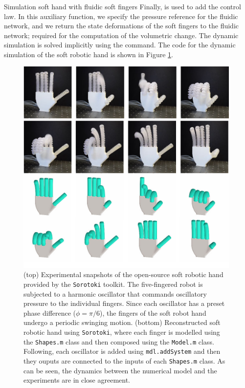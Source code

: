 \begin{example}{Simulation soft hand with fluidic soft fingers}
Finally,  is used to add the control law. In this auxiliary function, we specify the pressure reference for the fluidic network, and we return the state deformations of the soft fingers to the fluidic network; required for the computation of the volumetric change. The dynamic simulation is solved implicitly using the  command. The code for the dynamic simulation of the soft robotic hand is shown in Figure \ref{fig:C5:soft_hand_simulation}.

\begin{figure}[!t]
\centering
\includegraphics*[width=0.99\textwidth]{./pdf/thesis-figurex-6-14-1.pdf}
\caption{\small (top) Experimental snapshots of the open-source soft robotic hand provided by the \texttt{Sorotoki} toolkit. The five-fingered robot is subjected to a harmonic oscillator that commands oscillatory pressure to the individual fingers. Since each oscillator has a preset phase difference ($\phi = \pi/6$), the fingers of the soft robot hand undergo a periodic swinging motion. (bottom) Reconstructed soft robotic hand using \texttt{Sorotoki}, where each finger is modelled using the \texttt{Shapes.m} class and then composed using the \texttt{Model.m} class. Following, each oscillator is added using \texttt{mdl.addSystem} and then they ouputs are connected to the inputs of each \texttt{Shapes.m} class. As can be seen, the dynamics between the numerical model and the experiments are in close agreement. }
\label{fig:C5:soft_hand_simulation}
\end{figure}
\end{example}
